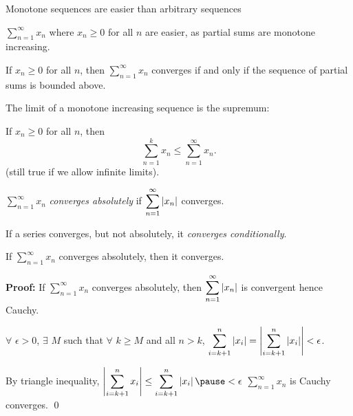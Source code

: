 \documentclass[10pt,aspectratio=169]{beamer}
\begin{document}
\begin{frame}
Monotone sequences are easier than arbitrary sequences

\pause
\medskip

\thus \quad
$\displaystyle\sum_{n=1}^\infty x_n$ where $x_n \geq 0$ for all $n$ are easier,
as partial sums are monotone increasing.

\pause
\begin{proposition}
If $x_n \geq 0$ for all $n$, then $\displaystyle\sum_{n=1}^\infty x_n$ converges if and only if
the sequence of partial sums is bounded above.
\end{proposition}

\pause
The limit of a monotone increasing sequence is the supremum:

\pause
If
$x_n \geq 0$ for all $n$, then
\begin{equation*}
\sum_{n=1}^k x_n \leq
\sum_{n=1}^\infty x_n .
\end{equation*}
\pause
(still true if we allow infinite limits).

\end{frame}

\begin{frame}

\begin{definition}
$\displaystyle\sum_{n=1}^\infty x_n$
\emph{converges absolutely} if
$\displaystyle\sum_{n=1}^\infty \left\lvert {x_n} \right\rvert$ converges.

\pause
If a series converges, but not absolutely,
it \emph{converges conditionally}.
\end{definition}

\pause
\begin{proposition}
If $\displaystyle\sum_{n=1}^\infty x_n$ converges absolutely, then it converges.
\end{proposition}

\pause
\textbf{Proof:}
If $\displaystyle\sum_{n=1}^\infty x_n$ converges absolutely, then
$\displaystyle\sum_{n=1}^\infty \left\lvert {x_n} \right\rvert$ is convergent hence Cauchy.

\pause
\medskip

$\forall$ $\epsilon > 0$,
$\exists$ $M$ such that $\forall$ $k \geq M$ and all $n > k$,
\quad
$\displaystyle
\sum_{i=k+1}^n \left\lvert {x_i} \right\rvert 
=
\left\lvert { \sum_{i=k+1}^n \left\lvert {x_i} \right\rvert } \right\rvert
<
\epsilon$.

\pause
\medskip

By triangle inequality, %
$\displaystyle
\abs{ \sum_{i=k+1}^n x_i }
\leq
\sum_{i=k+1}^n \abs{x_i}
\pause
<
\epsilon$
%
\pause
\wthus
$\displaystyle\sum_{n=1}^\infty x_n$ is Cauchy ~\thus~ converges.
\qed

\end{frame}
\end{document}
